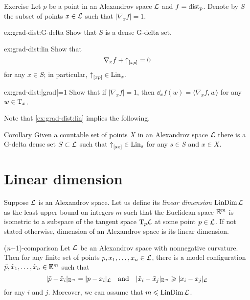 \begin{thm}{Exercise}\label{ex:grad-dist}
Let $p$ be a point in an Alexandrov space $\mathcal{L}$ and $f\z=\distfun_p$.
Denote by $S$ the subset of points $x\in\mathcal{L}$ such that $|\nabla_xf|=1$.

\begin{subthm}{ex:grad-dist:G-delta}
Show that $S$ is a dense G-delta set.
\end{subthm}

\begin{subthm}{ex:grad-dist:lin}
Show that 
\[\nabla_xf+{\uparrow}_{[{x}{p}]}=0\]
for any 
$x\in S$;
in particular, ${\uparrow}_{[{x}{p}]}\in \mathop{\rm Lin}\nolimits_x$.
\end{subthm}

\begin{subthm}{ex:grad-dist:|grad|=1}
Show that if $|\nabla_xf|=1$, then $\dd_xf(w)= \langle\nabla_xf,w\rangle$ for any $w\in \mathrm{T}_x$.
\end{subthm}


\end{thm}

Note that \ref{ex:grad-dist:lin} implies the following.

\begin{thm}{Corollary}\label{cor:euclid-subcone}
Given a countable set of points $X$ in an Alexandrov space $\mathcal{L}$
there is a G-delta dense set $S\subset\mathcal{L}$
such that 
${\uparrow}_{[{s}{x}]}\in \mathop{\rm Lin}\nolimits_s$
for any $s\in S$ and $x\in X$.
\end{thm}

\section{Linear dimension}

Suppose $\mathcal{L}$ is an Alexandrov space.
Let us define its \emph{linear dimension} $\mathop{\rm LinDim}\nolimits \mathcal{L}$ as the least upper bound on integers $m$ such that 
the Euclidean space $\mathbb{E}^m$ is isometric to a subspace of the tangent space $\mathrm{T}_p\mathcal{L}$ at some point $p\in \mathcal{L}$.
If not stated otherwise, dimension of an Alexandrov space is its linear dimension.

\begin{thm}{(\textit{n}+1)-comparison}
Let $\mathcal{L}$ be an Alexandrov space with nonnegative curvature.
Then for any finite set of points $p,x_1,\dots,x_n\in \mathcal{L}$, there is a model configuration 
$\tilde p,\tilde x_1,\dots,\tilde x_n\in \mathbb{E}^m$ such that 
\[|\tilde p-\tilde x_i|_{\mathbb{E}^m}=| p- x_i|_{\mathcal{L}}
\quad\text{and}\quad
|\tilde x_i-\tilde x_j|_{\mathbb{E}^m}\geqslant |x_i- x_j|_{\mathcal{L}}\]
for any $i$ and $j$.
Moreover, we can assume that $m\leqslant \mathop{\rm LinDim}\nolimits\mathcal{L}$. 
\end{thm}

